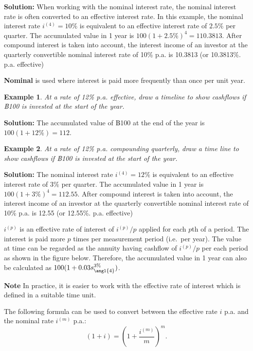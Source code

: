 \documentclass[
]{book}
\theoremstyle{definition}
\theoremstyle{definition}
\newtheorem{example}{Example}[chapter]
\theoremstyle{definition}
\theoremstyle{definition}
\theoremstyle{remark}
\begin{document}
\textbf{Solution:} When working with the nominal interest rate, the nominal
interest rate is often converted to an effective interest rate. In this
example, the nominal interest rate \(i^{(4)} = 10\%\) is equivalent to an
effective interest rate of \(2.5\%\) per quarter. The accumulated value in
1 year is \(100 (1 + 2.5\%)^4 = 110.3813\). After compound interest is
taken into account, the interest income of an investor at the quarterly
convertible nominal interest rate of 10\% p.a. is 10.3813 (or 10.3813\%.
p.a. effective)

\textbf{Nominal} is used where interest is paid more frequently than once per
unit year.

\begin{example}
\emph{At a rate of 12\% p.a. effective, draw a timeline to show cashflows if
฿100 is invested at the start of the year.}
\end{example}

\textbf{Solution:} The accumulated value of ฿100 at the end of the year is
\(100 (1 + 12\%) = 112\).

\begin{example}
\emph{At a rate of 12\% p.a. compounding quarterly, draw a time line to show
cashflows if ฿100 is invested at the start of the year.}
\end{example}

\textbf{Solution:} The nominal interest rate \(i^{(4)} = 12\%\) is equivalent
to an effective interest rate of \(3\%\) per quarter. The accumulated
value in 1 year is \(100 (1 + 3\%)^4 = 112.55\). After compound interest
is taken into account, the interest income of an investor at the
quarterly convertible nominal interest rate of 10\% p.a. is 12.55 (or
12.55\%. p.a. effective)

\(i^{(p)}\) is an effective rate of interest of \(i^{(p)}/p\) applied for
each \(p\)th of a period. The interest is paid more \(p\) times per
measurement period (i.e.~per year). The value at time can be regarded as
the annuity having cashflow of \(i^{(p)}/p\) per each period as shown in
the figure below. Therefore, the accumulated value in 1 year can also be
calculated as \(100( 1 + 0.03 s_{\angl{4}}^{3\%})\).

\textbf{Note} In practice, it is easier to work with the effective rate of
interest which is defined in a suitable time unit.

The following formula can be used to convert between the effective rate
\(i\) p.a. and the nominal rate \(i^{(m)}\) p.a.:
\[( 1 + i) = \left( 1 + \frac{i^{(m)}}{m}\right)^m.\]
\end{document}
